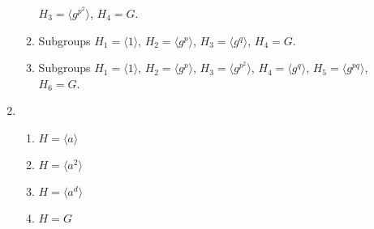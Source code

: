 \documentclass[11pt]{article}
\newcommand{\<}{\ensuremath{\langle}}
\renewcommand{\>}{\ensuremath{\rangle}}
\theoremstyle{plain}
\theoremstyle{definition}
\begin{document}
\begin{enumerate}
\begin{enumerate}
$H_3=\langle g^{p^2}\rangle$, $H_4=G$.
\item Subgroups $H_1=\langle 1\rangle$, $H_2=\langle g^p\rangle$,
$H_3=\langle g^{q}\rangle$, $H_4=G$.
\item Subgroups 
$H_1=\langle 1\rangle$, $H_2=\langle g^p\rangle$,
$H_3=\langle g^{p^2}\rangle$, $H_4=\langle g^q\rangle$, 
$H_5=\langle g^{pq}\rangle$,  $H_6=G$.
\end{enumerate}
\item \begin{enumerate}
\item $H=\langle a\rangle$
\item $H=\langle a^2\rangle$
\item $H=\langle a^d\rangle$
\item $H=G$
\end{enumerate}
\end{enumerate}
\end{document}
